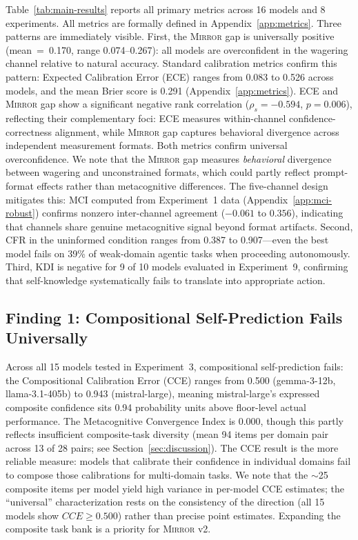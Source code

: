 \documentclass[10pt]{article}
\newcommand{\mirror}{\textsc{Mirror}}
\newcommand{\CCE}{CCE}
\newcommand{\KDI}{KDI}
\newcommand{\CFR}{CFR}
\begin{document}
Table~\ref{tab:main-results} reports all primary metrics across 16 models and 8
experiments. All metrics are formally defined in Appendix~\ref{app:metrics}. Three patterns are immediately visible. First, the \mirror{} gap is
universally positive (mean~=~0.170, range 0.074--0.267): all models are
overconfident in the wagering channel relative to natural accuracy.
Standard calibration metrics confirm this pattern: Expected Calibration Error (ECE)
ranges from 0.083 to 0.526 across models, and the mean Brier score is 0.291
(Appendix~\ref{app:metrics}). ECE and \mirror{} gap show a significant negative
rank correlation ($\rho_s = -0.594$, $p = 0.006$), reflecting their
complementary foci: ECE measures within-channel confidence-correctness alignment,
while \mirror{} gap captures behavioral divergence across independent measurement
formats. Both metrics confirm universal overconfidence.
We note that the \mirror{} gap measures \emph{behavioral} divergence between
wagering and unconstrained formats, which could partly reflect prompt-format
effects rather than metacognitive differences. The five-channel design mitigates
this: MCI computed from Experiment~1 data (Appendix~\ref{app:mci-robust}) confirms
nonzero inter-channel agreement ($-0.061$ to $0.356$), indicating that channels
share genuine metacognitive signal beyond format artifacts. Second, \CFR{}
in the uninformed condition ranges from 0.387 to 0.907---even the best model fails
on 39\% of weak-domain agentic tasks when proceeding autonomously. Third, \KDI{}
is negative for 9 of 10 models evaluated in Experiment~9, confirming that
self-knowledge systematically fails to translate into appropriate action.



\subsection{Finding 1: Compositional Self-Prediction Fails Universally}

Across all 15 models tested in Experiment~3, compositional self-prediction fails:
the Compositional Calibration Error (\CCE{}) ranges from 0.500 (gemma-3-12b,
llama-3.1-405b) to 0.943 (mistral-large), meaning mistral-large's expressed
composite confidence sits 0.94 probability units above floor-level actual
performance. The Metacognitive Convergence Index is 0.000, though this partly
reflects insufficient composite-task diversity (mean 94 items per domain pair
across 13 of 28 pairs; see Section~\ref{sec:discussion}). The \CCE{} result is the more reliable measure: models that calibrate their
confidence in individual domains fail to compose those calibrations for
multi-domain tasks. We note that the $\sim$25 composite items per model yield high
variance in per-model \CCE{} estimates; the ``universal'' characterization rests on
the consistency of the direction (all 15 models show $\CCE{} \geq 0.500$) rather
than precise point estimates. Expanding the composite task bank is a priority for
\mirror{} v2.
\end{document}
